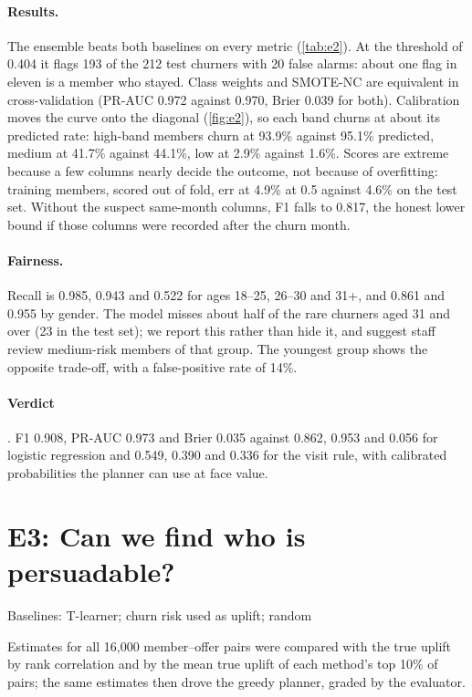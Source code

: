 \paragraph{Results.} The ensemble beats both baselines on every metric (\cref{tab:e2}). At the threshold of 0.404 it flags 193 of the 212 test churners with 20 false alarms: about one flag in eleven is a member who stayed. Class weights and SMOTE-NC are equivalent in cross-validation (PR-AUC 0.972 against 0.970, Brier 0.039 for both). Calibration moves the curve onto the diagonal (\cref{fig:e2}), so each band churns at about its predicted rate: high-band members churn at 93.9\% against 95.1\% predicted, medium at 41.7\% against 44.1\%, low at 2.9\% against 1.6\%. Scores are extreme because a few columns nearly decide the outcome, not because of overfitting: training members, scored out of fold, err at 4.9\% at 0.5 against 4.6\% on the test set. Without the suspect same-month columns, F1 falls to 0.817, the honest lower bound if those columns were recorded after the churn month.

\paragraph{Fairness.} Recall is 0.985, 0.943 and 0.522 for ages 18--25, 26--30 and 31+, and 0.861 and 0.955 by gender. The model misses about half of the rare churners aged 31 and over (23 in the test set); we report this rather than hide it, and suggest staff review medium-risk members of that group. The youngest group shows the opposite trade-off, with a false-positive rate of 14\%.

\paragraph{Verdict} . F1 0.908, PR-AUC 0.973 and Brier 0.035 against 0.862, 0.953 and 0.056 for logistic regression and 0.549, 0.390 and 0.336 for the visit rule, with calibrated probabilities the planner can use at face value.

\section{E3: Can we find who is persuadable?}
\label{sec:e3}
\quad\textsf{\small Baselines: T-learner; churn risk used as uplift; random}

Estimates for all 16,000 member--offer pairs were compared with the true uplift by rank correlation and by the mean true uplift of each method's top 10\% of pairs; the same estimates then drove the greedy planner, graded by the evaluator.

